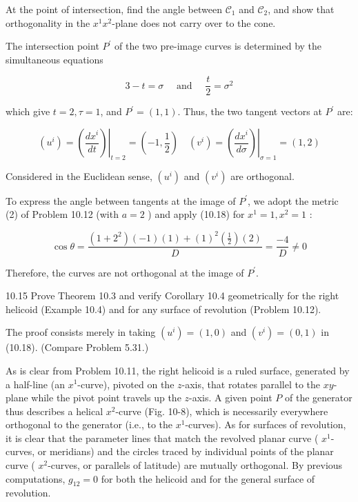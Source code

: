 \documentclass[10pt]{article}
\begin{document}
At the point of intersection, find the angle between $\mathscr{C}_{1}$ and $\mathscr{C}_{2}$, and show that orthogonality in the $x^{1} x^{2}$-plane does not carry over to the cone.

The intersection point $P^{\prime}$ of the two pre-image curves is determined by the simultaneous equations

$$
3-t=\sigma \quad \text { and } \quad \frac{t}{2}=\sigma^{2}
$$

which give $t=2, \tau=1$, and $P^{\prime}=(1,1)$. Thus, the two tangent vectors at $P^{\prime}$ are:

$$
\left(u^{i}\right)=\left.\left(\frac{d x^{i}}{d t}\right)\right|_{t=2}=\left(-1, \frac{1}{2}\right) \quad\left(v^{i}\right)=\left.\left(\frac{d x^{i}}{d \sigma}\right)\right|_{\sigma=1}=(1,2)
$$

Considered in the Euclidean sense, $\left(u^{i}\right)$ and $\left(v^{i}\right)$ are orthogonal.

To express the angle between tangents at the image of $P^{\prime}$, we adopt the metric (2) of Problem 10.12 (with $a=2$ ) and apply (10.18) for $x^{1}=1, x^{2}=1$ :

$$
\cos \theta=\frac{\left(1+2^{2}\right)(-1)(1)+(1)^{2}\left(\frac{1}{2}\right)(2)}{D}=\frac{-4}{D} \neq 0
$$

Therefore, the curves are not orthogonal at the image of $P^{\prime}$.

10.15 Prove Theorem 10.3 and verify Corollary 10.4 geometrically for the right helicoid (Example 10.4) and for any surface of revolution (Problem 10.12).

The proof consists merely in taking $\left(u^{i}\right)=(1,0)$ and $\left(v^{i}\right)=(0,1)$ in (10.18). (Compare Problem 5.31.)

As is clear from Problem 10.11, the right helicoid is a ruled surface, generated by a half-line (an $x^{1}$-curve), pivoted on the $z$-axis, that rotates parallel to the $x y$-plane while the pivot point travels up the $z$-axis. A given point $P$ of the generator thus describes a helical $x^{2}$-curve (Fig. 10-8), which is necessarily everywhere orthogonal to the generator (i.e., to the $x^{1}$-curves). As for surfaces of revolution, it is clear that the parameter lines that match the revolved planar curve ( $x^{1}$-curves, or meridians) and the circles traced by individual points of the planar curve ( $x^{2}$-curves, or parallels of latitude) are mutually orthogonal. By previous computations, $g_{12}=0$ for both the helicoid and for the general surface of revolution.
\end{document}
